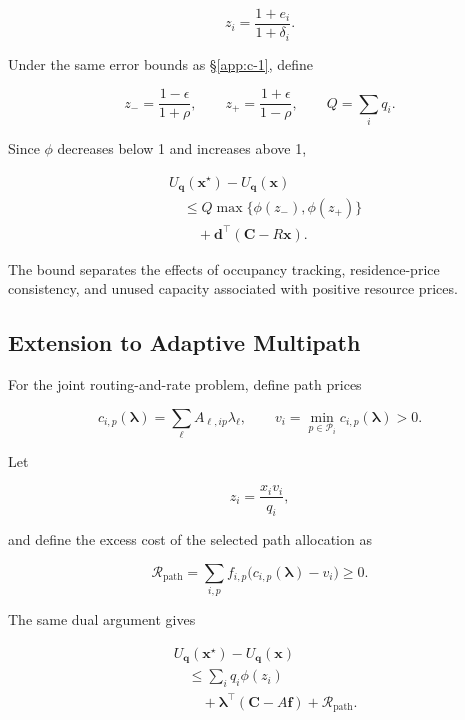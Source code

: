 \begin{equation}
\label{eq:app-c-12}
z_i=\frac{1+e_i}{1+\delta_i}.
\end{equation}

Under the same error bounds as \S\ref{app:c-1}, define

\begin{equation}
\label{eq:app-c-13}
z_-=\frac{1-\epsilon}{1+\rho},
\qquad
z_+=\frac{1+\epsilon}{1-\rho},
\qquad
Q=\sum_iq_i.
\end{equation}

Since \(\phi\) decreases below 1 and increases above 1,

\begin{equation}
\label{eq:app-c-14}
\boxed{\begin{aligned}
&U_{\mathbf q}(\mathbf x^\star)-U_{\mathbf q}(\mathbf x)\\
&\quad\le Q\max\{\phi(z_-),\phi(z_+)\}\\
&\qquad+\mathbf d^\top(\mathbf C-R\mathbf x).
\end{aligned}}
\end{equation}

The bound separates the effects of occupancy tracking, residence-price consistency, and unused capacity associated with positive resource prices.

\subsection{Extension to Adaptive Multipath}
\label{app:c-3}

For the joint routing-and-rate problem, define path prices

\begin{equation}
\label{eq:app-c-15}
c_{i,p}(\boldsymbol\lambda)
=\sum_\ell A_{\ell,ip}\lambda_\ell,
\qquad
v_i=\min_{p\in\mathcal P_i}c_{i,p}(\boldsymbol\lambda)>0.
\end{equation}

Let

\[
z_i=\frac{x_iv_i}{q_i},
\]

and define the excess cost of the selected path allocation as

\begin{equation}
\label{eq:app-c-16}
\mathcal R_{\mathrm{path}}
=
\sum_{i,p}
f_{i,p}\big(c_{i,p}(\boldsymbol\lambda)-v_i\big)\ge0.
\end{equation}

The same dual argument gives

\begin{equation}
\label{eq:app-c-17}
\boxed{\begin{aligned}
&U_{\mathbf q}(\mathbf x^\star)-U_{\mathbf q}(\mathbf x)\\
&\quad\le\sum_iq_i\phi(z_i)\\
&\qquad+\boldsymbol\lambda^\top(\mathbf C-A\mathbf f)
+\mathcal R_{\mathrm{path}}.
\end{aligned}}
\end{equation}

